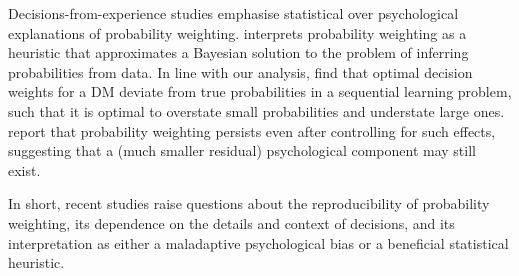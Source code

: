 \documentclass[a4paper, 12pt]{article}
\newcommand{\seclabel}[1]{\label{sec:#1}}
\newcommand{\MK}[1]{\textcolor{red}{\textit{***MK: #1 MK***}}}
\begin{document}
Decisions-from-experience studies emphasise statistical over psychological explanations of probability weighting. \textcite{Martins2006} interprets probability weighting as a heuristic that approximates a Bayesian solution to the problem of inferring probabilities from data. In line with our analysis, \textcite{SeoETAL2019} find that optimal decision weights for a DM deviate from true probabilities in a sequential learning problem, such that it is optimal to overstate small probabilities and understate large ones. \textcite{FoxHadar2006,UngemachETAL2009} report that probability weighting persists even after controlling for such effects, suggesting that a (much smaller residual) psychological component may still exist.

In short, recent studies raise questions about the reproducibility of probability weighting, its dependence on the details and context of decisions, and its interpretation as either a maladaptive psychological bias or a beneficial statistical heuristic.


\end{document}
